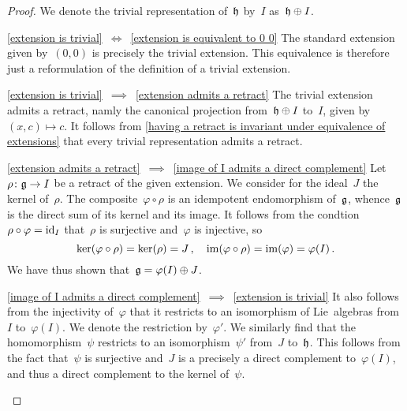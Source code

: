 \begin{proof}
  We denote the trivial representation of~$\mathfrak{h}$ by~$I$ as~$\mathfrak{h} \oplus I$.
  \begin{implicationlist}
    \item[\ref{extension is trivial}~$\iff$~\ref{extension is equivalent to 0 0}]
      The standard extension given by~$(0,0)$ is precisely the trivial extension.
      This equivalence is therefore just a reformulation of the definition of a trivial extension.
    \item[\ref{extension is trivial}~$\implies$~\ref{extension admits a retract}]
      The trivial extension admits a retract, namly the canonical projection from~$\mathfrak{h} \oplus I$ to~$I$, given by~$(x,c) \mapsto c$.
      It follows from \cref{having a retract is invariant under equivalence of extensions} that every trivial representation admits a retract.
    \item[\ref{extension admits a retract}~$\implies$~\ref{image of I admits a direct complement}]
      Let~$\rho \colon \glie \to I$ be a retract of the given extension.
      We consider for the ideal~$J$ the kernel of~$\rho$.
      The composite~$\varphi \circ \rho$ is an idempotent endomorphism of~$\mathfrak{g}$, whence~$\mathfrak{g}$ is the direct sum of its kernel and its image.
      It follows from the condtion~$\rho \circ \varphi = \mathrm{id}_I$ that~$\rho$ is surjective and~$\varphi$ is injective, so
      \[
        \ker(\varphi \circ \rho) = \ker(\rho) = J \,,
        \quad
        \operatorname{im}(\varphi \circ \rho) = \operatorname{im}(\varphi) = \varphi(I) \,.
      \]
      We have thus shown that~$\mathfrak{g} = \varphi(I) \oplus J$.
    \item[\ref{image of I admits a direct complement}~$\implies$~\ref{extension is trivial}]
      It also follows from the injectivity of~$\varphi$ that it restricts to an isomorphism of Lie~algebras from~$I$ to~$\varphi(I)$.
      We denote the restriction by~$\varphi'$.
      We similarly find that the homomorphism~$\psi$ restricts to an isomorphism~$\psi'$ from~$J$ to~$\mathfrak{h}$.
      This follows from the fact that~$\psi$ is surjective and~$J$ is a precisely a direct complement to~$\varphi(I)$, and thus a direct complement to the kernel of~$\psi$.


\end{implicationlist}
\end{proof}
